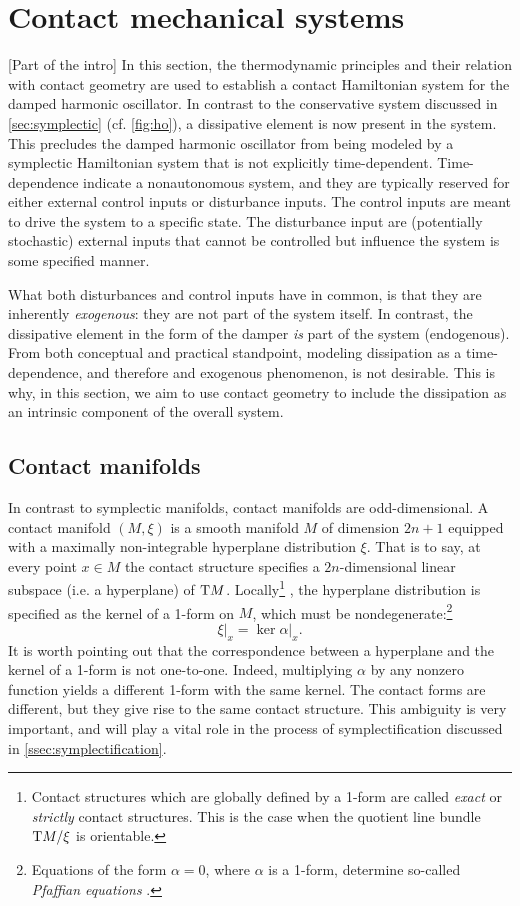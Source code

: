 \section{Contact mechanical systems}
\label{sec:contact}

[Part of the intro]
In this section, the thermodynamic principles and their relation with contact geometry are used to establish a contact Hamiltonian system for the damped harmonic oscillator. In contrast to the conservative system discussed in \cref{sec:symplectic} (cf. \cref{fig:ho}), a dissipative element is now present in the system. This precludes the damped harmonic oscillator from being modeled by a symplectic Hamiltonian system that is not explicitly time-dependent. Time-dependence indicate a nonautonomous system, and they are typically reserved for either external control inputs or disturbance inputs. The control inputs are meant to drive the system to a specific state. The disturbance input are (potentially stochastic) external inputs that cannot be controlled but influence the system is some specified manner. 

What both disturbances and control inputs have in common, is that they are inherently \emph{exogenous}: they are not part of the system itself. In contrast, the dissipative element in the form of the damper \emph{is} part of the system (endogenous). From both conceptual and practical standpoint, modeling dissipation as a time-dependence, and therefore and exogenous phenomenon, is not desirable. This is why, in this section, we aim to use contact geometry to include the dissipation as an intrinsic component of the overall system.

\subsection{Contact manifolds}
In contrast to symplectic manifolds, contact manifolds are odd-dimensional. A contact manifold $(M, \xi)$ is a smooth manifold $M$ of dimension $2n + 1$ equipped with a maximally non-integrable hyperplane distribution $\xi$. That is to say, at every point $x \in M$ the contact structure specifies a $2n$-dimensional linear subspace (i.e. a hyperplane) of $\mathrm{T}M$. Locally\footnote
{
    Contact structures which are globally defined by a 1-form are called \emph{exact} or \emph{strictly} contact structures. This is the case when the quotient line bundle $ \mathrm{T}M/\xi$ is orientable. 
}
, the hyperplane distribution is specified as the kernel of a 1-form on $M$, which must be nondegenerate:\footnote{Equations of the form $ \alpha = 0$, where $\alpha$ is a 1-form, determine so-called \emph{Pfaffian equations} \cite{Libermann1987}.} \cite{Geiges2008, Arnold1989, Cannas2001}
$$ \xi\vert_x = \ker{\alpha}\vert_x. $$
It is worth pointing out that the correspondence between a hyperplane and the kernel of a 1-form is not one-to-one. Indeed, multiplying $\alpha$ by any nonzero function yields a different 1-form with the same kernel. The contact forms are different, but they give rise to the same contact structure. This ambiguity is very important, and will play a vital role in the process of symplectification discussed in \cref{ssec:symplectification}.

